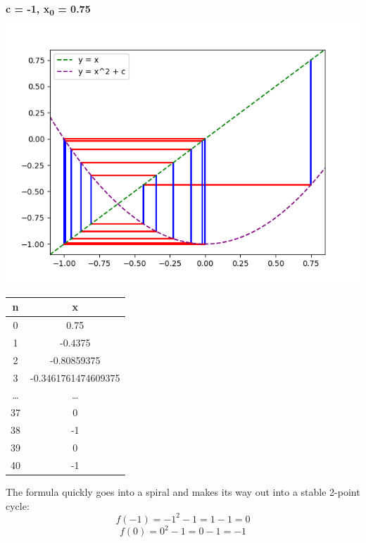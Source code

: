 \documentclass{article}
\begin{document}
\newpage
\begin{center}
    \textbf{c = -1, x\textsubscript{0} = 0.75}
    \includegraphics[scale=0.8]{6}
    \begin{tabular}{| c | c |}
        \hline
        n & x\\
        \hline
        0 & 0.75\\
        1 & -0.4375\\
        2 & -0.80859375\\ 
        3 & -0.3461761474609375\\
        \dots & \dots \\ 
        37 & 0\\
        38 &  -1\\
        39 & 0\\
        40 &  -1\\
        \hline
    \end{tabular}
    \end{center}
The formula quickly goes into a spiral and makes its way out into a stable 2-point cycle:
\[
f(-1) = -1^{2} - 1 = 1 - 1 = 0 
\]
\[
f(0) = 0^{2} - 1 = 0 - 1 = -1 
\]
\newpage
\end{document}
